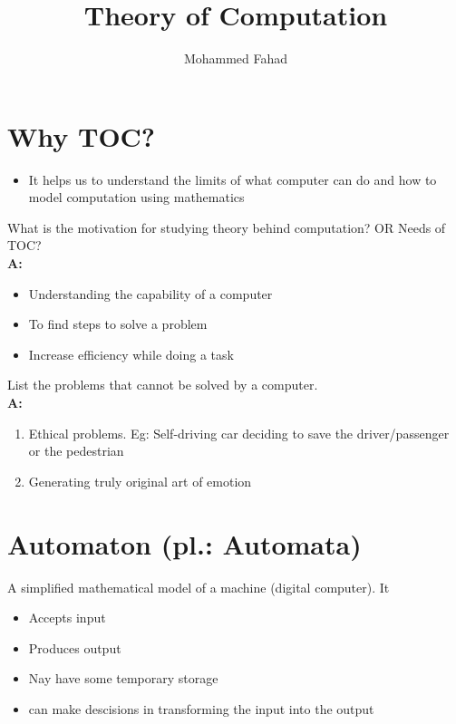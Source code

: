 \documentclass{article}
\title{Theory of Computation}
\author{Mohammed Fahad}
\newcommand{\answer}[1]{\\\textbf{A:} #1}
\begin{document}
\maketitle

\section{Why TOC?}

\begin{itemize}
    \item It helps us to understand the limits of what computer can do and how to model computation using mathematics
\end{itemize}

\begin{qanda}
    \item What is the motivation for studying theory behind computation? OR Needs of TOC?
    \answer{
        \begin{itemize}
            \item Understanding the capability of a computer
            \item To find steps to solve a problem
            \item Increase efficiency while doing a task
        \end{itemize}
    }

    \item List the problems that cannot be solved by a computer.
    \answer{
        \begin{enumerate}
            \item Ethical problems. Eg: Self-driving car deciding to save the driver/passenger or the pedestrian
            \item Generating truly original art of emotion
        \end{enumerate}
    }

\end{qanda}

\section*{Automaton (pl.: Automata)}

A simplified mathematical model of a machine (digital computer). It 
\begin{itemize}
    \item Accepts input
    \item Produces output
    \item Nay have some temporary storage
    \item can make descisions in transforming the input into the output
\end{itemize}
\end{document}
